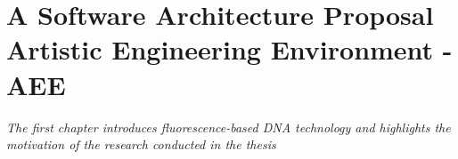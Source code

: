 \chapter{A Software Architecture Proposal Artistic Engineering Environment -AEE}
\label{chap:articulo}
\textit{The first chapter introduces fluorescence-based DNA technology and highlights the motivation of the research conducted in the thesis}
\vfill
\cleardoublepage
